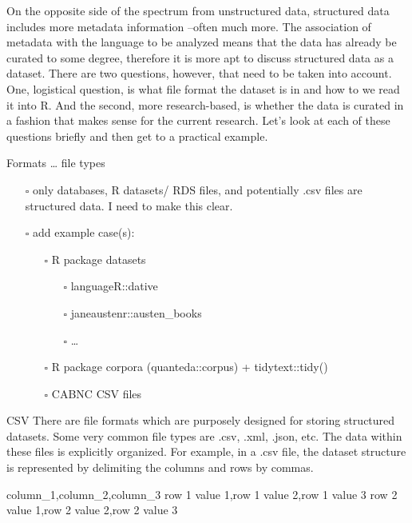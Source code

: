 \documentclass[
  letterpaper,
  DIV=11,
  numbers=noendperiod]{scrreport}
\newenvironment{Shaded}{\begin{snugshade}}{\end{snugshade}}
\newcommand{\NormalTok}[1]{\textcolor[rgb]{0.00,0.00,0.00}{#1}}
\providecommand{\tightlist}{%
  \setlength{\itemsep}{0pt}\setlength{\parskip}{0pt}}\usepackage{longtable,booktabs,array}
\theoremstyle{definition}
\theoremstyle{remark}
\begin{document}
On the opposite side of the spectrum from unstructured data, structured
data includes more metadata information --often much more. The
association of metadata with the language to be analyzed means that the
data has already be curated to some degree, therefore it is more apt to
discuss structured data as a dataset. There are two questions, however,
that need to be taken into account. One, logistical question, is what
file format the dataset is in and how to we read it into R. And the
second, more research-based, is whether the data is curated in a fashion
that makes sense for the current research. Let's look at each of these
questions briefly and then get to a practical example.

Formats \ldots{} file types

\begin{itemize}
\item[$\square$]
  only databases, R datasets/ RDS files, and potentially .csv files are
  structured data. I need to make this clear.
\item[$\square$]
  add example case(s):

  \begin{itemize}
  \tightlist
  \item[$\square$]
    R package datasets

    \begin{itemize}
    \tightlist
    \item[$\square$]
      languageR::dative
    \item[$\square$]
      janeaustenr::austen\_books
    \item[$\square$]
      \ldots{}
    \end{itemize}
  \item[$\square$]
    R package corpora (quanteda::corpus) + tidytext::tidy()
  \item[$\square$]
    CABNC CSV files
  \end{itemize}
\end{itemize}

CSV There are file formats which are purposely designed for storing
structured datasets. Some very common file types are .csv, .xml, .json,
etc. The data within these files is explicitly organized. For example,
in a .csv file, the dataset structure is represented by delimiting the
columns and rows by commas.

\begin{Shaded}
\begin{Highlighting}[]
\NormalTok{column\_1,column\_2,column\_3}
\NormalTok{row 1 value 1,row 1 value 2,row 1 value 3}
\NormalTok{row 2 value 1,row 2 value 2,row 2 value 3}
\end{Highlighting}
\end{Shaded}
\end{document}
